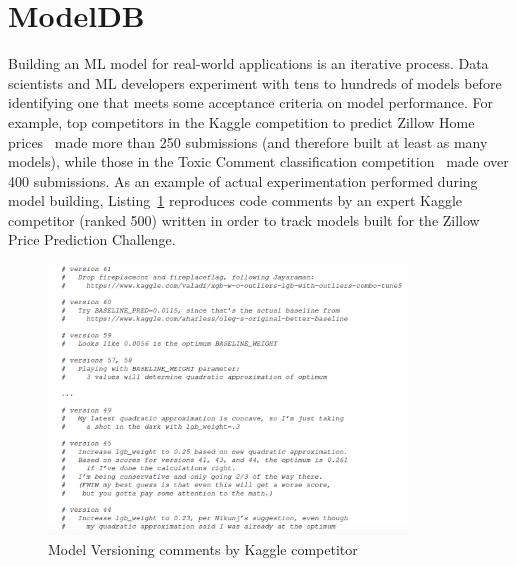 \documentclass[11pt]{article}
\newcommand{\mdb}{{\sc ModelDB}\xspace}
\newcommand{\Dss}{Data scientists\xspace}
\newcommand{\mldevs}{ML developers\xspace}
\begin{document}
\section{\mdb}
\label{sec:modeldb}

Building an ML model for real-world applications is an iterative process. 
\Dss and \mldevs experiment with tens to hundreds of models before identifying 
one that meets some acceptance criteria on model performance.
For example, top competitors in the Kaggle competition to predict Zillow Home prices~\cite{zillow} made more than 250 submissions (and therefore built at least as many models), while those in the Toxic Comment classification competition~\cite{toxic-comments} made over 400 submissions.
As an example of actual experimentation performed during model building, Listing~\ref{lst:versioning_2} reproduces code comments by an expert Kaggle competitor (ranked 500) written in order to track models built for the Zillow Price Prediction Challenge.

\begin{figure}[tb] 
\centerline{
\includegraphics[trim=0mm 0mm 0mm 0mm,
width=0.85\textwidth,clip=true]{figs/listing.png}}
\caption{Model Versioning comments by Kaggle competitor}
\label{lst:versioning_2}
\end{figure}

\end{document}
